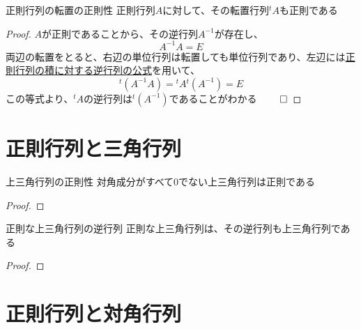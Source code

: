 \documentclass[../../../topic_linear-algebra]{subfiles}
\begin{document}
\begin{theorem}{正則行列の転置の正則性}\label{thm:transpose-of-invertible}
  正則行列$A$に対して、その転置行列${}^t A$も正則である
\end{theorem}

\begin{proof}
  $A$が正則であることから、その逆行列$A^{-1}$が存在し、
  \begin{equation*}
    A^{-1}A = E
  \end{equation*}
  両辺の転置をとると、右辺の単位行列は転置しても単位行列であり、左辺には\hyperref[thm:inverse-of-product]{正則行列の積に対する逆行列の公式}を用いて、
  \begin{equation*}
    {}^t(A^{-1}A) = {}^t A {}^t (A^{-1}) = E
  \end{equation*}
  この等式より、${}^t A$の逆行列は${}^t (A^{-1})$であることがわかる $\qed$
\end{proof}

\sectionline
\section{正則行列と三角行列}

\begin{theorem}{上三角行列の正則性}
  対角成分がすべて0でない上三角行列は正則である
\end{theorem}

\begin{proof}
\end{proof}

\br

\begin{theorem}{正則な上三角行列の逆行列}\label{thm:inverse-of-upper-triangular}
  正則な上三角行列は、その逆行列も上三角行列である
\end{theorem}

\begin{proof}
  \todo{}
\end{proof}

\sectionline
\section{正則行列と対角行列}

\end{document}
